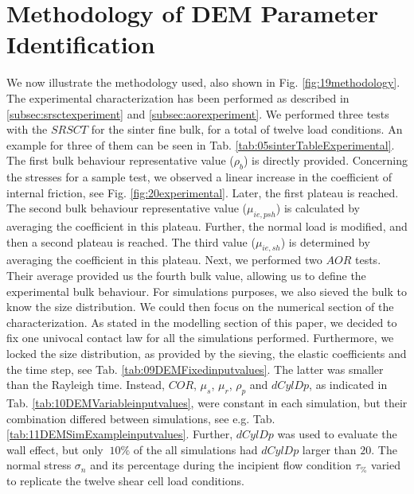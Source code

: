 \section{Methodology of DEM Parameter Identification}
\label{sec:methodology}

We now illustrate the methodology used, also shown in Fig.
\ref{fig:19methodology}.
%
The experimental characterization has been performed as described in
\ref{subsec:srsctexperiment} and \ref{subsec:aorexperiment}. We performed
three tests with the $SRSCT$ for the sinter fine bulk, for a total of twelve
load conditions. An example for three of them can be seen in Tab. \ref{tab:05sinterTableExperimental}.
% 
The first bulk behaviour representative value ($\rho_b$) is directly provided. 
Concerning the stresses for a sample test, we observed a linear increase in the
coefficient of internal friction, see Fig. \ref{fig:20experimental}.
Later, the first plateau is reached. 
The second bulk behaviour representative value ($\mu_{ie,psh}$) is calculated by averaging the coefficient in this plateau. 
Further, the normal load is modified, and then a second plateau is reached. The third value ($\mu_{ie,sh}$) is 
determined by averaging the coefficient in this plateau. 
Next, we performed two $AOR$ tests. 
Their average provided us the fourth bulk value, allowing us to define the experimental bulk behaviour. 
For simulations purposes, we also sieved the bulk to know the size distribution.
We could then focus on the numerical section of the characterization. 
As stated in the modelling section of this paper, we decided to fix one univocal contact law for all the simulations performed. 
Furthermore, we locked the size distribution, as provided by the sieving, the
elastic coefficients and the time step, see Tab.
\ref{tab:09DEMFixedinputvalues}.
% 
% 
The latter was smaller than the Rayleigh time. Instead, $COR$, $\mu_s$, $\mu_r$,
$\rho_p$ and $dCylDp$, as indicated in Tab. \ref{tab:10DEMVariableinputvalues},
were constant in each simulation, but their combination differed between
simulations, see e.g. Tab. \ref{tab:11DEMSimExampleinputvalues}.
% 
Further, $dCylDp$ was used to evaluate the wall effect, but only $~10\%$ of the
all simulations had $dCylDp$ larger than $20$. The normal stress $\sigma_n$ and its
percentage during the incipient flow condition $\tau_{\%}$
varied to replicate the twelve shear cell load conditions. 
